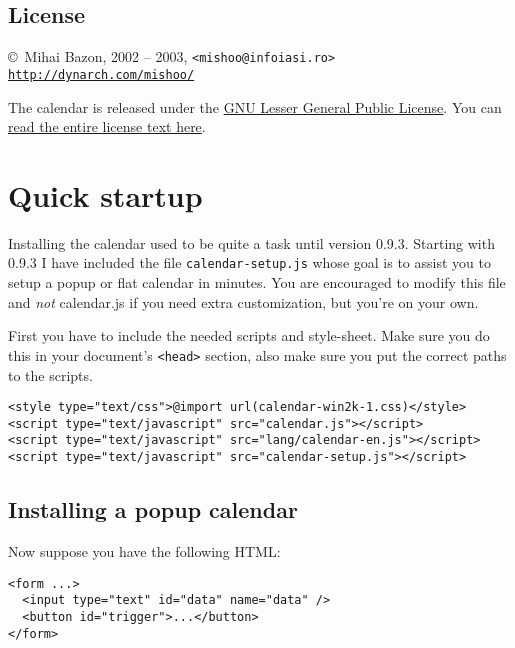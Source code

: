 \documentclass[a4paper,10pt]{article}
\begin{document}
\subsection{License}

\begin{center}
\noindent \copyright\ Mihai Bazon, 2002 -- 2003, \texttt{<mishoo@infoiasi.ro>}\\
\href{http://dynarch.com/mishoo/}{\texttt{http://dynarch.com/mishoo/}}\\
\end{center}

The calendar is released under the
{\href{http://www.gnu.org/licenses/lgpl.html}{GNU Lesser General Public License}}.  You
can {\href{http://www.gnu.org/licenses/lgpl.html}{read the entire license text
here}}.




\section{Quick startup}\label{sec:quick-start}

Installing the calendar used to be quite a task until version 0.9.3.  Starting
with 0.9.3 I have included the file \texttt{calendar-setup.js} whose goal is to
assist you to setup a popup or flat calendar in minutes.  You are
encouraged to modify this file and \emph{not} calendar.js if you need
extra customization, but you're on your own.

First you have to include the needed scripts and style-sheet.  Make sure you do
this in your document's \texttt{<head>} section, also make sure you put the
correct paths to the scripts.

\begin{verbatim}
<style type="text/css">@import url(calendar-win2k-1.css)</style>
<script type="text/javascript" src="calendar.js"></script>
<script type="text/javascript" src="lang/calendar-en.js"></script>
<script type="text/javascript" src="calendar-setup.js"></script>
\end{verbatim}

\subsection{Installing a popup calendar}\label{sec:quick-start-popup}

\noindent Now suppose you have the following HTML:

\begin{verbatim}
<form ...>
  <input type="text" id="data" name="data" />
  <button id="trigger">...</button>
</form>
\end{verbatim}
\end{document}
